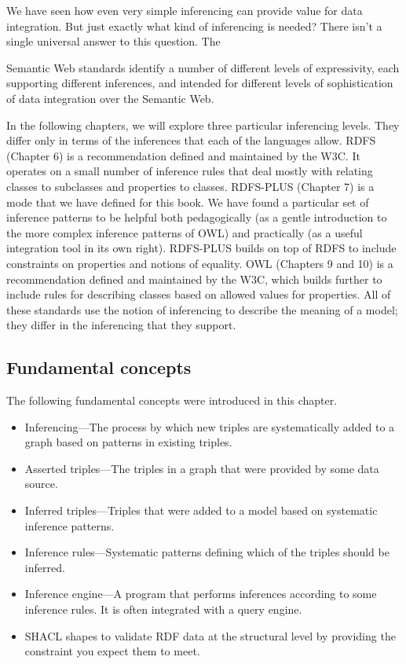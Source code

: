 We have seen how even very simple inferencing can provide value for data
integration. But just exactly what kind of inferencing is needed? There
isn't a single universal answer to this question. The

Semantic Web standards identify a number of different levels of
expressivity, each supporting different inferences, and intended for
different levels of sophistication of data integration over the Semantic
Web.

In the following chapters, we will explore three particular inferencing
levels. They differ only in terms of the inferences that each of the
languages allow. RDFS (Chapter 6) is a recommendation defined and
maintained by the W3C. It operates on a small number of inference rules
that deal mostly with relating classes to subclasses and properties to
classes. RDFS-PLUS (Chapter 7) is a mode that we have defined for this
book. We have found a particular set of inference patterns to be helpful
both pedagogically (as a gentle introduction to the more complex
inference patterns of OWL) and practically (as a useful integration tool
in its own right). RDFS-PLUS builds on top of RDFS to include
constraints on properties and notions of equality. OWL (Chapters 9 and
10) is a recommendation defined and maintained by the W3C, which builds
further to include rules for describing classes based on allowed values
for properties. All of these standards use the notion of inferencing to
describe the meaning of a model; they differ in the inferencing that
they support.

\subsection{Fundamental concepts}

The following fundamental concepts were introduced in this chapter.

\begin{itemize}
\item Inferencing---The process by which new triples are systematically added
to a graph based on patterns in existing triples.

\item Asserted triples---The triples in a graph that were provided by some
data source.

\item Inferred triples---Triples that were added to a model based on
systematic inference patterns.

\item Inference rules---Systematic patterns defining which of the triples
should be inferred.

\item Inference engine---A program that performs inferences according to some
inference rules. It is often integrated with a query engine.

\item
  SHACL shapes to validate RDF data at the structural level by providing
  the constraint you expect them to meet.
  \end{itemize}
  